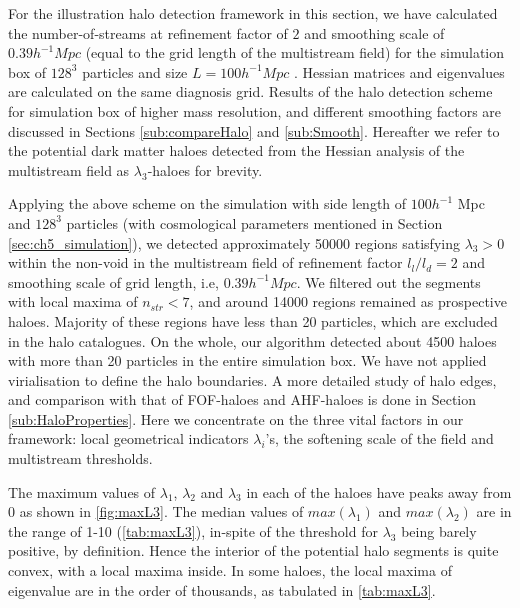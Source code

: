 {For the illustration halo detection framework in this section, we have calculated the number-of-streams at refinement factor of $2$ and smoothing scale of $0.39 h^{-1} Mpc$ (equal to the grid length of the multistream field) for the simulation box of $128^3$ particles and size $L = 100 h^{-1} Mpc$ . Hessian matrices and eigenvalues are calculated on the same diagnosis grid. Results of the halo detection scheme for simulation box of higher mass resolution, and different smoothing factors are discussed in Sections \ref{sub:compareHalo} and \ref{sub:Smooth}. Hereafter we refer to the potential dark matter haloes detected from the Hessian analysis of the multistream field as $\lambda_3$-haloes for brevity. 
 

Applying the above scheme on the simulation with side length of $100 h^{-1}$ Mpc and $128^3$ particles (with cosmological parameters mentioned in Section \ref{sec:ch5_simulation}), we detected approximately 50000 regions satisfying $\lambda_3 > 0$ within the non-void in the multistream field of refinement factor $l_l/l_d = 2$ and smoothing scale of grid length, i.e, $0.39 h^{-1} Mpc$. We filtered out the segments with local maxima of $n_{str} < 7$, and around 14000 regions remained as prospective haloes. Majority of these regions have less than 20 particles, which are excluded in the halo catalogues. On the whole, our algorithm detected about 4500 haloes with more than 20 particles in the entire simulation box. We have not applied virialisation to define the halo boundaries. A more detailed study of halo edges, and comparison with that of FOF-haloes and AHF-haloes is done in Section \ref{sub:HaloProperties}. Here we concentrate on the three vital factors in our framework: local geometrical indicators $\lambda_i$'s, the softening scale of the field and multistream thresholds.

The maximum values of $\lambda_1$, $\lambda_2$ and $\lambda_3$ in each of the haloes have peaks away from 0 as shown in \autoref{fig:maxL3}. The median values of $max(\lambda_1)$ and $max(\lambda_2)$ are in the range of 1-10 (\autoref{tab:maxL3}), in-spite of the threshold for $\lambda_3$ being barely positive, by definition. Hence the interior of the potential halo segments is quite convex, with a local maxima inside. In some haloes, the local maxima of eigenvalue are in the order of thousands, as tabulated in \autoref{tab:maxL3}. 


}
